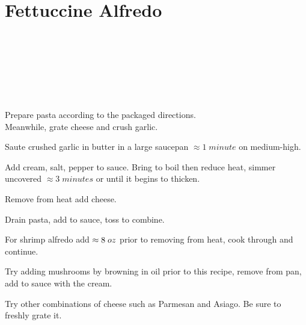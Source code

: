 \section{Fettuccine Alfredo}
\begin{recipestats}[
	servings=2 people,
	preptime=10 minutes,
	bakingtime=20 minutes,
	source=\citetitle{newCookBook2014} \cite{newCookBook2014},
	]
\end{recipestats}

\begin{ingredientcolumns}
	\begin{ingredientblock}
		\\
		\\
		\\
	\end{ingredientblock}
	\begin{ingredientblock}
		\ingredient[\onehalf][\teaspoon]{salt}\\
		\ingredient[\oneeighth][\teaspoon]{pepper}\\
		\ingredient[2][\ounce]{Parmesan}
	\end{ingredientblock}
\end{ingredientcolumns}

\begin{preparation}
\item Prepare pasta according to the packaged directions.\\Meanwhile, grate cheese and crush garlic.
\item Saute crushed garlic in butter in a large saucepan $\approx1\; minute$ on medium-high.
\item Add cream, salt, pepper to sauce. Bring to boil then reduce heat, simmer uncovered $\approx3\;minutes$ or until it begins to thicken.
\item Remove from heat add cheese.
\item Drain pasta, add to sauce, toss to combine.
\end{preparation}

\begin{variation}
\item For shrimp alfredo add $\approx8\; oz$ prior to removing from heat, cook through and continue.
\item Try adding mushrooms by browning in oil prior to this recipe, remove from pan, add to sauce with the cream.
\item Try other combinations of cheese such as Parmesan and Asiago. Be sure to freshly grate it.
\end{variation}

\recipeend